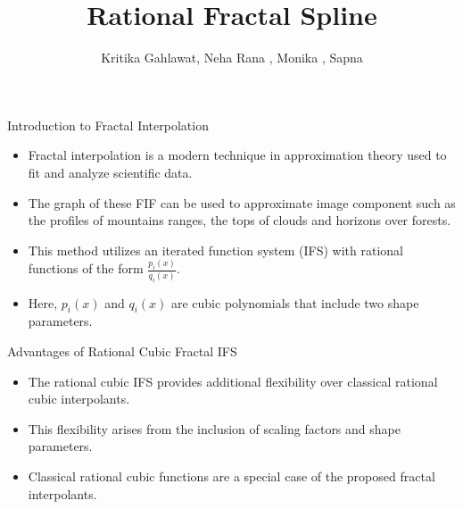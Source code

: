 \documentclass{beamer}
\title{Rational Fractal Spline}
\author{Kritika Gahlawat, Neha Rana , Monika , Sapna}
\date{}
\begin{document}
\frame{\titlepage}

\begin{frame}{Introduction to Fractal Interpolation}
    \begin{itemize}
        
 \item Fractal interpolation is a modern technique in approximation theory used to fit and analyze scientific data.
       \item The graph of these FIF can be used to approximate image component such as the profiles of mountains ranges, the tops of clouds and horizons over forests.
        \item This method utilizes an iterated function system (IFS) with rational functions of the form \( \frac{p_i(x)}{q_i(x)} \).
        \item Here, \( p_i(x) \) and \( q_i(x) \) are cubic polynomials that include two shape parameters.
        







    \end{itemize}
\end{frame}

\begin{frame}{Advantages of Rational Cubic Fractal IFS}
    \begin{itemize}
        \item The rational cubic IFS provides additional flexibility over classical rational cubic interpolants.
        \item This flexibility arises from the inclusion of scaling factors and shape parameters.
        \item Classical rational cubic functions are a special case of the proposed fractal interpolants.
        
    \end{itemize}
\end{frame}
\end{document}
